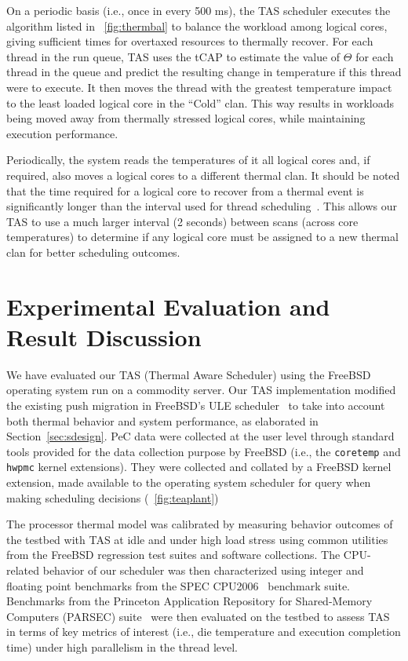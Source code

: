 \documentclass[times, 10pt,twocolumn]{IEEEtran}
\begin{document}
On a periodic basis (i.e., once in every 500 ms), the TAS scheduler
executes the algorithm listed in \figurename~\ref{fig:thermbal} to
balance the workload among logical cores, giving sufficient times for
overtaxed resources to thermally recover.  For each thread in the run
queue, TAS uses the tCAP to estimate the value of $\Theta$ for each
thread in the queue and predict the resulting change in temperature if
this thread were to execute.  It then moves the thread with the greatest
temperature impact to the least loaded logical core in the ``Cold''
clan.  This way results in workloads being moved away from thermally
stressed logical cores, while maintaining execution performance.

Periodically, the system reads the temperatures of it all logical cores
and, if required, also moves a logical cores to a different thermal
clan.  It should be noted that the time required for a logical core to
recover from a thermal event is significantly longer than the interval
used for thread scheduling~\cite{Choi2007}. This allows our TAS to use a
much larger interval (2 seconds) between scans (across core
temperatures) to determine if any logical core must be assigned to a new
thermal clan for better scheduling outcomes.

\section{Experimental Evaluation and Result Discussion}
\label{sec:experiment} 
We have evaluated our TAS (Thermal Aware Scheduler) using the FreeBSD
operating system run on a commodity server.  Our TAS implementation
modified the existing push migration in FreeBSD's ULE
scheduler~\cite{Roberson2003} to take into account both thermal behavior
and system performance, as elaborated in Section~\ref{sec:sdesign}.  PeC
data were collected at the user level through standard tools provided
for the data collection purpose by FreeBSD (i.e., the \texttt{coretemp}
and \texttt{hwpmc} kernel extensions).  They were collected and collated
by a FreeBSD kernel extension, made available to the operating system
scheduler for query when making scheduling decisions
(\figurename~\ref{fig:teaplant})

The processor thermal model was calibrated by measuring behavior
outcomes of the testbed with TAS at idle and under high load stress
using common utilities from the FreeBSD regression test suites and
software collections.  The CPU-related behavior of our scheduler was
then characterized using integer and floating point benchmarks from the
SPEC CPU2006~\cite{Henning2006} benchmark suite.  Benchmarks from the
Princeton Application Repository for Shared-Memory Computers (PARSEC)
suite~\cite{Bienia2008} were then evaluated on the testbed to assess TAS
in terms of key metrics of interest (i.e., die temperature and execution
completion time) under high parallelism in the thread level.
\end{document}
